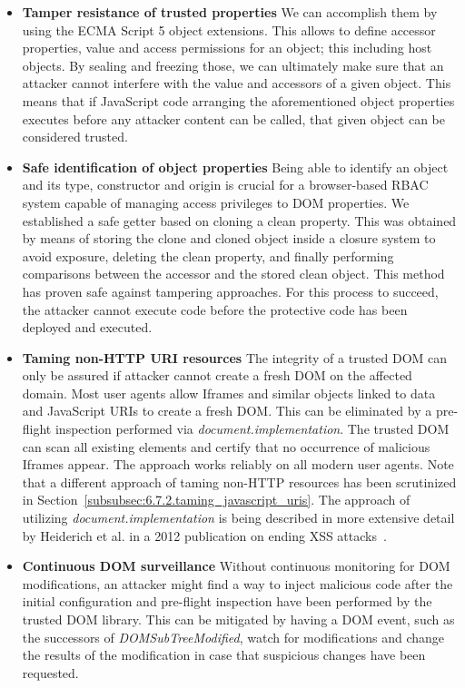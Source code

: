     \begin{itemize}
      \item \textbf{Tamper resistance of trusted properties} We can accomplish them by using the ECMA Script 5 object extensions. This allows to define accessor properties, value and access permissions for an object; this including host objects. By sealing and freezing those, we can ultimately make sure that an attacker cannot interfere with the value and accessors of a given object. This means that if JavaScript code arranging the aforementioned object properties executes before any attacker content can be called, that given object can be considered trusted.
      \item \textbf{Safe identification of object properties} Being able to identify an object and its type, constructor and origin is crucial for a browser-based RBAC system capable of managing access privileges to DOM properties. We established a safe getter based on cloning a clean property. This was obtained by means of storing the clone and cloned object inside a closure system to avoid exposure, deleting the clean property, and finally performing comparisons between the accessor and the stored clean object. This method has proven safe against tampering approaches. For this process to succeed, the attacker cannot execute code before the protective code has been deployed and executed.
      \item \textbf{Taming non-HTTP URI resources} The integrity of a trusted DOM can only be assured if attacker cannot create a fresh DOM on the affected domain. Most user agents allow Iframes and similar objects linked to data and JavaScript URIs to create a fresh DOM. This can be eliminated by a pre-flight inspection performed via \textit{document.implementation}. The trusted DOM can scan all existing elements and certify that no occurrence of malicious Iframes appear. The approach works reliably on all modern user agents. Note that a different approach of taming non-HTTP resources has been scrutinized in Section~\ref{subsubsec:6.7.2.taming_javascript_uris}. The approach of utilizing \textit{document.implementation} is being described in more extensive detail by Heiderich et al. in a 2012 publication on ending XSS attacks~\cite{heiderich2012hedgehog}.
      \item \textbf{Continuous DOM surveillance} Without continuous monitoring for DOM modifications, an attacker might find a way to inject malicious code after the initial configuration and pre-flight inspection have been performed by the trusted DOM library. This can be mitigated by having a DOM event, such as the successors of \textit{DOMSubTreeModified}, watch for modifications and change the results of the modification in case that suspicious changes have been requested. 
    \end{itemize}

